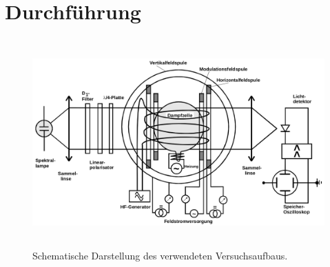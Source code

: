\newpage
\section{Durchführung}
\label{sec:Durchführung}

\begin{figure}
  \centering
  \includegraphics[height=8.0cm]{content/pictures/Aufbau.png}
  \caption{Schematische Darstellung des verwendeten Versuchsaufbaus.}
  \label{fig:Versuchsaufbau}
\end{figure}

\FloatBarrier